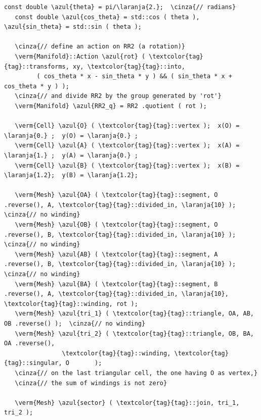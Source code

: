 \begin{Verbatim}[commandchars=\\\{\},formatcom=\small\tt,frame=single,
   label=parag-\ref{\numb section 7.\numb parag 15}.cpp,rulecolor=\color{moldura},
   baselinestretch=0.94,framesep=2mm                                             ]
   const double \azul{theta} = pi/\laranja{2.};  \cinza{// radians}
   const double \azul{cos_theta} = std::cos ( theta ), \azul{sin_theta} = std::sin ( theta );
	
   \cinza{// define an action on RR2 (a rotation)}
   \verm{Manifold}::Action \azul{rot} ( \textcolor{tag}{tag}::transforms, xy, \textcolor{tag}{tag}::into,
         ( cos_theta * x - sin_theta * y ) && ( sin_theta * x + cos_theta * y ) );
   \cinza{// and divide RR2 by the group generated by 'rot'}
   \verm{Manifold} \azul{RR2_q} = RR2 .quotient ( rot );

   \verm{Cell} \azul{O} ( \textcolor{tag}{tag}::vertex );  x(O) = \laranja{0.} ;  y(O) = \laranja{0.} ;
   \verm{Cell} \azul{A} ( \textcolor{tag}{tag}::vertex );  x(A) = \laranja{1.} ;  y(A) = \laranja{0.} ;
   \verm{Cell} \azul{B} ( \textcolor{tag}{tag}::vertex );  x(B) = \laranja{1.2};  y(B) = \laranja{1.2};

   \verm{Mesh} \azul{OA} ( \textcolor{tag}{tag}::segment, O .reverse(), A, \textcolor{tag}{tag}::divided_in, \laranja{10} );  \cinza{// no winding}
   \verm{Mesh} \azul{OB} ( \textcolor{tag}{tag}::segment, O .reverse(), B, \textcolor{tag}{tag}::divided_in, \laranja{10} );  \cinza{// no winding}
   \verm{Mesh} \azul{AB} ( \textcolor{tag}{tag}::segment, A .reverse(), B, \textcolor{tag}{tag}::divided_in, \laranja{10} );  \cinza{// no winding}
   \verm{Mesh} \azul{BA} ( \textcolor{tag}{tag}::segment, B .reverse(), A, \textcolor{tag}{tag}::divided_in, \laranja{10}, \textcolor{tag}{tag}::winding, rot );
   \verm{Mesh} \azul{tri_1} ( \textcolor{tag}{tag}::triangle, OA, AB, OB .reverse() );  \cinza{// no winding}
   \verm{Mesh} \azul{tri_2} ( \textcolor{tag}{tag}::triangle, OB, BA, OA .reverse(),
                \textcolor{tag}{tag}::winding, \textcolor{tag}{tag}::singular, O       );
   \cinza{// on the last triangular cell, the one having O as vertex,}
   \cinza{// the sum of windings is not zero}

   \verm{Mesh} \azul{sector} ( \textcolor{tag}{tag}::join, tri_1, tri_2 );
\end{Verbatim}


